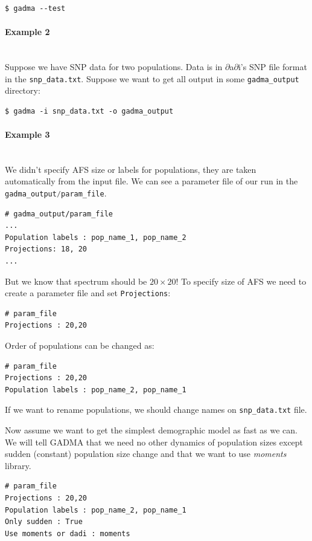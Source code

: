 \documentclass[12pt]{article}
\makeatletter
\newcommand{\dadi}{$\partial$a$\partial$i\xspace}
\newcommand{\moments}{\textit{moments}\xspace}
\newcommand{\py}[1]{\lstinline[language=Python, showstringspaces=False]@#1@}
\makeatother
\begin{document}
\begin{lstlisting}
$ gadma --test
\end{lstlisting}

\paragraph{Example 2}\mbox{}\\
Suppose we have SNP data for two populations. Data is in \dadi's SNP file format in the \py{snp_data.txt}. Suppose we want to get all output in some \py{gadma_output} directory:


\begin{lstlisting}
$ gadma -i snp_data.txt -o gadma_output
\end{lstlisting}


\paragraph{Example 3}\mbox{}\\
We didn't specify AFS size or labels for populations, they are taken automatically from the input file. We can see a parameter file of our run in the \py{gadma_output/param_file}. 
\begin{lstlisting}
# gadma_output/param_file
...
Population labels : pop_name_1, pop_name_2
Projections: 18, 20
...
\end{lstlisting}
But we know that spectrum should be $20 \times 20$! To specify size of AFS we need to create a parameter file and set \py{Projections}:

\begin{lstlisting}
# param_file
Projections : 20,20
\end{lstlisting}

Order of populations can be changed as:
\begin{lstlisting}
# param_file
Projections : 20,20
Population labels : pop_name_2, pop_name_1
\end{lstlisting}

If we want to rename populations, we should change names on \py{snp_data.txt} file.

Now assume we want to get the simplest demographic model as fast as we can. We will tell GADMA that we need no other dynamics of population sizes except sudden (constant) population size change and that we want to use \moments library.

\begin{lstlisting}
# param_file
Projections : 20,20
Population labels : pop_name_2, pop_name_1
Only sudden : True
Use moments or dadi : moments
\end{lstlisting}
\end{document}
